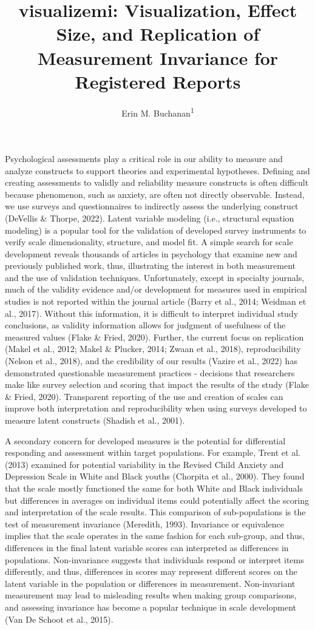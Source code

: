 \documentclass[
  man,floatsintext]{apa7}
\title{visualizemi: Visualization, Effect Size, and Replication of Measurement Invariance for Registered Reports}
\author{Erin M. Buchanan\textsuperscript{1}}
\date{}
\affiliation{\vspace{0.5cm}\textsuperscript{1} Harrisburg University of Science and Technology}
\begin{document}
\maketitle

Psychological assessments play a critical role in our ability to measure and analyze constructs to support theories and experimental hypotheses. Defining and creating assessments to validly and reliability measure constructs is often difficult because phenomenon, such as anxiety, are often not directly observable. Instead, we use surveys and questionnaires to indirectly assess the underlying construct (DeVellis \& Thorpe, 2022). Latent variable modeling (i.e., structural equation modeling) is a popular tool for the validation of developed survey instruments to verify scale dimensionality, structure, and model fit. A simple search for scale development reveals thousands of articles in psychology that examine new and previously published work, thus, illustrating the interest in both measurement and the use of validation techniques. Unfortunately, except in specialty journals, much of the validity evidence and/or development for measures used in empirical studies is not reported within the journal article (Barry et al., 2014; Weidman et al., 2017). Without this information, it is difficult to interpret individual study conclusions, as validity information allows for judgment of usefulness of the measured values (Flake \& Fried, 2020). Further, the current focus on replication (Makel et al., 2012; Makel \& Plucker, 2014; Zwaan et al., 2018), reproducibility (Nelson et al., 2018), and the credibility of our results (Vazire et al., 2022) has demonstrated questionable measurement practices - decisions that researchers make like survey selection and scoring that impact the results of the study (Flake \& Fried, 2020). Transparent reporting of the use and creation of scales can improve both interpretation and reproducibility when using surveys developed to measure latent constructs (Shadish et al., 2001).

A secondary concern for developed measures is the potential for differential responding and assessment within target populations. For example, Trent et al. (2013) examined for potential variability in the Revised Child Anxiety and Depression Scale in White and Black youths (Chorpita et al., 2000). They found that the scale mostly functioned the same for both White and Black individuals but differences in averages on individual items could potentially affect the scoring and interpretation of the scale results. This comparison of sub-populations is the test of measurement invariance (Meredith, 1993). Invariance or equivalence implies that the scale operates in the same fashion for each sub-group, and thus, differences in the final latent variable scores can interpreted as differences in populations. Non-invariance suggests that individuals respond or interpret items differently, and thus, differences in scores may represent different scores on the latent variable in the population or differences in measurement. Non-invariant measurement may lead to misleading results when making group comparisons, and assessing invariance has become a popular technique in scale development (Van De Schoot et al., 2015).
\end{document}
